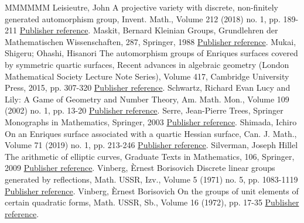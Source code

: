 \begin{thebibliography}{MMMMMM}
 Leisieutre, John A projective variety with discrete, non-finitely generated automorphism group, Invent. Math., Volume 212 (2018) no. 1, pp. 189-211 \href{https://ahl.centre-mersenne.org/item/AHL_2020__3__1133_0/#Lesieutre}{Publisher reference}.
 Maskit, Bernard Kleinian Groups, Grundlehren der Mathematischen Wissenschaften, 287, Springer, 1988 \href{https://ahl.centre-mersenne.org/item/AHL_2020__3__1133_0/#Maskit}{Publisher reference}.
 Mukai, Shigeru; Ohashi, Hisanori The automorphism groups of Enriques surfaces covered by symmetric quartic surfaces, Recent advances in algebraic geometry (London Mathematical Society Lecture Note Series), Volume 417, Cambridge University Press, 2015, pp. 307-320 \href{https://ahl.centre-mersenne.org/item/AHL_2020__3__1133_0/#Mukai}{Publisher reference}.
 Schwartz, Richard Evan Lucy and Lily: A Game of Geometry and Number Theory, Am. Math. Mon., Volume 109 (2002) no. 1, pp. 13-20 \href{https://ahl.centre-mersenne.org/item/AHL_2020__3__1133_0/#Schwartz}{Publisher reference}.
 Serre, Jean-Pierre Trees, Springer Monographs in Mathematics, Springer, 2003 \href{https://ahl.centre-mersenne.org/item/AHL_2020__3__1133_0/#Trees}{Publisher reference}.
 Shimada, Ichiro On an Enriques surface associated with a quartic Hessian surface, Can. J. Math., Volume 71 (2019) no. 1, pp. 213-246 \href{https://ahl.centre-mersenne.org/item/AHL_2020__3__1133_0/#Shimada}{Publisher reference}.
 Silverman, Joseph Hillel The arithmetic of elliptic curves, Graduate Texts in Mathematics, 106, Springer, 2009 \href{https://ahl.centre-mersenne.org/item/AHL_2020__3__1133_0/#Silverman}{Publisher reference}.
 Vinberg, Èrnest Borisovich Discrete linear groups generated by reflections, Math. USSR, Izv., Volume 5 (1971) no. 5, pp. 1083-1119 \href{https://ahl.centre-mersenne.org/item/AHL_2020__3__1133_0/#Vinberg2}{Publisher reference}.
 Vinberg, Èrnest Borisovich On the groups of unit elements of certain quadratic forms, Math. USSR, Sb., Volume 16 (1972), pp. 17-35 \href{https://ahl.centre-mersenne.org/item/AHL_2020__3__1133_0/#Vinberg}{Publisher reference}.
\end{thebibliography}

